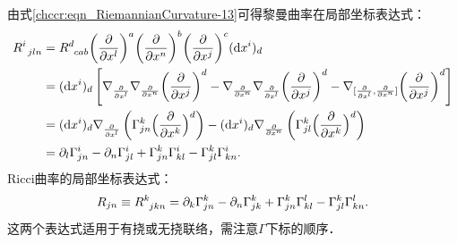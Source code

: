 由式\eqref{chccr:eqn_RiemannianCurvature-13}可得黎曼曲率在局部坐标表达式：
\begin{align}
    R_{\hphantom{a} jln}^i &=R_{\hphantom{a} cab}^d {\left( {\frac{\partial }{{\partial {x^l}}}} \right)^a}
    {\left( {\frac{\partial }{{\partial {x^n}}}} \right)^b}
    {\left( {\frac{\partial }{{\partial {x^j}}}} \right)^c} {({\rm d}x^i)_d} \notag\\
    &= {({\rm d}x^i)_d} \left[\nabla _{\frac{\partial }{\partial x^l} }
    \nabla _{\frac{\partial }{\partial x^n}} {\left( {\frac{\partial }{{\partial {x^j}}}} \right)^d}
    - {\nabla _{\frac{\partial }{\partial x^n}}}
    {\nabla _{\frac{\partial }{\partial x^l}}}{\left( {\frac{\partial }{{\partial {x^j}}}} \right)^d}
    - {\nabla _{[\frac{\partial }{\partial x^l},\frac{\partial }{\partial x^n}]}}
    {\left( {\frac{\partial }{{\partial {x^j}}}} \right)^d}\right] \notag \\
    &= {({\rm d}x^i)_d}{\nabla _{\frac{\partial }{\partial x^l}}} \left(\Gamma_{jn}^{k}
    {\Bigl( {\frac{\partial }{{\partial {x^k}}}} \Bigr)^d} \right)
    -{({\rm d}x^i)_d} {\nabla _{\frac{\partial }{\partial x^n}}} \left(\Gamma_{jl}^{k}
    {\Bigl( {\frac{\partial }{{\partial {x^k}}}} \Bigr)^d} \right) \notag\\
    &= {\partial_l} \Gamma_{jn}^{i} -\partial_n \Gamma_{jl}^{i}+ \Gamma_{jn}^{k} \Gamma_{kl}^{i}
    - \Gamma_{jl}^{k}\Gamma_{kn}^{i} . \label{chccr:eqn_Riemannian13-component}
\end{align}
Ricci曲率的局部坐标表达式：
\begin{equation}\label{chccr:eqn_Ricci-component}
    R_{jn} \equiv R_{\hphantom{a} jkn}^k = {\partial_k} \Gamma_{jn}^{k} -\partial_n \Gamma_{jk}^{k}
    + \Gamma_{jn}^{k} \Gamma_{kl}^{l}- \Gamma_{jl}^{k}\Gamma_{kn}^{l} .
\end{equation}
这两个表达式适用于有挠或无挠联络，需注意$\Gamma$下标的顺序．



